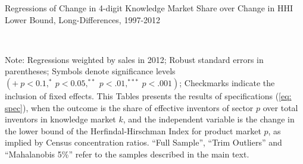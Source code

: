 \begin{sidewaystable}
\caption{Regressions of Change in 4-digit Knowledge Market Share over Change
in HHI Lower Bound, Long-Differences, 1997-2012\label{tab: RegShInvHHI}}

\begin{centering}
\par\end{centering}

\begin{centering}
\\
\par\end{centering}
\raggedright{}{\small{}Note: Regressions weighted by sales in 2012;
Robust standard errors in parentheses; Symbols denote significance
levels $\left(+\ p<0.1,^{*}\ p<0.05,^{**}\ p<.01,^{***}\ p<.001\right)$;
Checkmarks indicate the inclusion of fixed effects. This Tables presents
the results of specifications (\ref{eq: spec}), when the outcome
is the share of effective inventors of sector $p$ over total inventors
in knowledge market $k$, and the independent variable is the change
in the lower bound of the Herfindal-Hirschman Index for product market
$p$, as implied by Census concentration ratios. ``Full Sample'',
``Trim Outliers'' and ``Mahalanobis 5\%'' refer to the samples
described in the main text.}{\small\par}
\end{sidewaystable}

